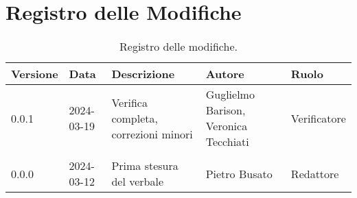 \section*{Registro delle Modifiche}
\begin{table}[ht!]	
		\centering
		\begin{tabular}{p{1.2cm} p{2cm} p{6cm} p{3cm} p{2cm}}
			\toprule
			\textbf{Versione}& \textbf{Data} & \textbf{Descrizione} & \textbf{Autore} & \textbf{Ruolo} \\
			\midrule
			0.0.1 & 2024-03-19 & Verifica completa, correzioni minori & Guglielmo Barison, Veronica Tecchiati  & Verificatore \\\\
			0.0.0 & 2024-03-12 & Prima stesura del verbale  & Pietro Busato & Redattore \\
			\bottomrule
		\end{tabular}
		\caption{Registro delle modifiche.}
		\label{table:Registro delle modifiche}
\end{table}